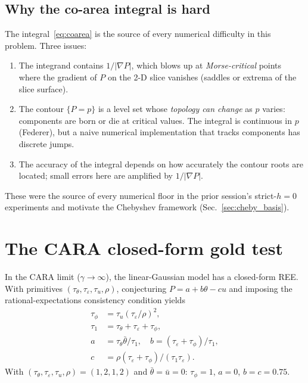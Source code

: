 \documentclass[10pt,twocolumn,a4paper]{article}
\begin{document}
\subsection{Why the co-area integral is hard}

The integral~\eqref{eq:coarea} is the source of every numerical difficulty
in this problem. Three issues:

\begin{enumerate}
\item The integrand contains $1/|\nabla P|$, which blows up at
\emph{Morse-critical} points where the gradient of $P$ on the 2-D slice
vanishes (saddles or extrema of the slice surface).

\item The contour $\{P = p\}$ is a level set whose \emph{topology can change}
as $p$ varies: components are born or die at critical values. The integral
is continuous in $p$ (Federer), but a naive numerical implementation that
tracks components has discrete jumps.

\item The accuracy of the integral depends on how accurately the contour
roots are located; small errors here are amplified by $1/|\nabla P|$.
\end{enumerate}

These were the source of every numerical floor in the prior session's
strict-$h=0$ experiments and motivate the Chebyshev framework
(Sec.~\ref{sec:cheby_basis}).

\section{The CARA closed-form gold test}
\label{sec:cara}

In the CARA limit ($\gamma \to \infty$), the linear-Gaussian model has a
closed-form REE. With primitives
$(\tau_\theta, \tau_\varepsilon, \tau_u, \rho)$, conjecturing
$P = a + b\theta - cu$ and imposing the rational-expectations consistency
condition yields
\begin{align}
\tau_\phi &= \tau_u (\tau_\varepsilon/\rho)^2, \nonumber \\
\tau_1 &= \tau_\theta + \tau_\varepsilon + \tau_\phi, \nonumber \\
a &= \tau_\theta\bar\theta/\tau_1, \quad
b = (\tau_\varepsilon + \tau_\phi)/\tau_1, \nonumber\\
c &= \rho(\tau_\varepsilon + \tau_\phi)/(\tau_1\tau_\varepsilon).
\label{eq:hellwig}
\end{align}
With $(\tau_\theta, \tau_\varepsilon, \tau_u, \rho) = (1,2,1,2)$ and
$\bar\theta = \bar u = 0$: $\tau_\phi = 1$, $a=0$, $b=c=0.75$.
\end{document}
